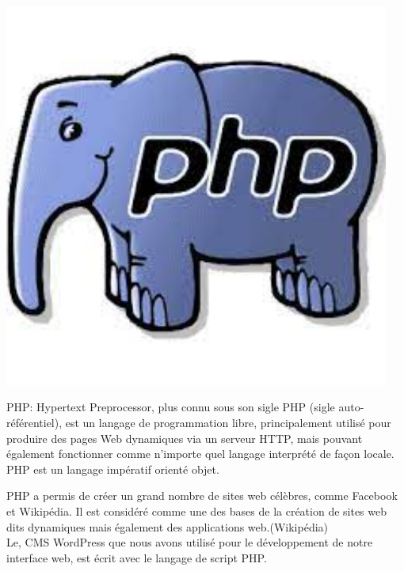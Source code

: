 \begin{itemize}
\begin{minipage}{.15\textwidth}
 	\includegraphics[width=0.95\textwidth]{D) IMAGES/php.jpg}
 \end{minipage}%
PHP: Hypertext Preprocessor, plus connu sous son sigle PHP (sigle auto-référentiel), est un langage de programmation libre, principalement utilisé pour produire des pages Web dynamiques via un serveur HTTP, mais pouvant également fonctionner comme n'importe quel langage interprété de façon locale. PHP est un langage impératif orienté objet.

PHP a permis de créer un grand nombre de sites web célèbres, comme Facebook et Wikipédia. Il est considéré comme une des bases de la création de sites web dits dynamiques mais également des applications web.(Wikipédia)\\
Le, CMS WordPress que nous avons utilisé pour le développement de notre interface web, est écrit avec le langage de script PHP.\\






\end{itemize}
